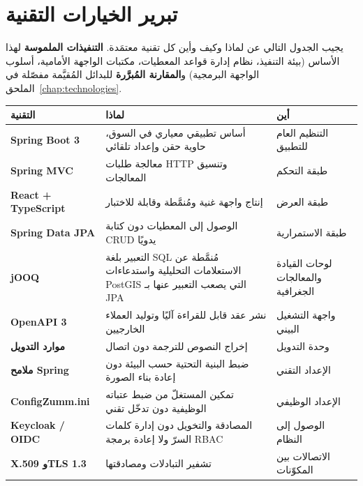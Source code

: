 \section{تبرير الخيارات التقنية}
يجيب الجدول التالي عن لماذا وكيف وأين كل تقنية معتمَدة. \textbf{التنفيذات
الملموسة} لهذا الأساس (بيئة التنفيذ، نظام إدارة قواعد المعطيات، مكتبات الواجهة
الأمامية، أسلوب الواجهة البرمجية) و\textbf{المقارنة المُبرَّرة} للبدائل
المُقيَّمة مفصّلة في الملحق~\ref{chap:technologies}.
\begin{xltabular}{\textwidth}{>{\bfseries}p{2.6cm} X p{5.4cm}}
\toprule
\textbf{التقنية} & \textbf{لماذا} & \textbf{أين} \\
\midrule
\endhead
Spring Boot 3 & أساس تطبيقي معياري في السوق، حاوية حقن وإعداد تلقائي & التنظيم العام للتطبيق \\
Spring MVC & معالجة طلبات HTTP وتنسيق المعالجات & طبقة التحكم \\
React + TypeScript & إنتاج واجهة غنية ومُنمَّطة وقابلة للاختبار & طبقة العرض \\
Spring Data JPA & الوصول إلى المعطيات دون كتابة CRUD يدويًا & طبقة الاستمرارية \\
jOOQ & التعبير بلغة SQL مُنمَّطة عن الاستعلامات التحليلية واستدعاءات PostGIS التي يصعب التعبير عنها بـ JPA & لوحات القيادة والمعالجات الجغرافية \\
OpenAPI 3 & نشر عقد قابل للقراءة آليًا وتوليد العملاء الخارجيين & واجهة التشغيل البيني \\
موارد التدويل & إخراج النصوص للترجمة دون اتصال & وحدة التدويل \\
ملامح Spring & ضبط البنية التحتية حسب البيئة دون إعادة بناء الصورة & الإعداد التقني \\
ConfigZumm.ini & تمكين المستغلّ من ضبط عتباته الوظيفية دون تدخّل تقني & الإعداد الوظيفي \\
Keycloak / OIDC & المصادقة والتخويل دون إدارة كلمات السرّ ولا إعادة برمجة RBAC & الوصول إلى النظام \\
X.509 وTLS 1.3 & تشفير التبادلات ومصادقتها & الاتصالات بين المكوّنات \\
\bottomrule
\end{xltabular}

